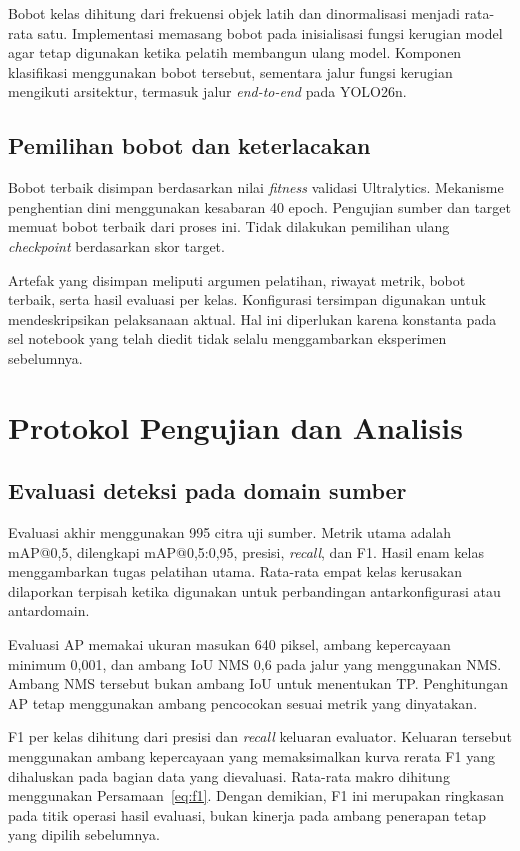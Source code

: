 Bobot kelas dihitung dari frekuensi objek latih dan dinormalisasi menjadi rata-rata satu. Implementasi memasang bobot pada inisialisasi fungsi kerugian model agar tetap digunakan ketika pelatih membangun ulang model. Komponen klasifikasi menggunakan bobot tersebut, sementara jalur fungsi kerugian mengikuti arsitektur, termasuk jalur \textit{end-to-end} pada YOLO26n.

\subsection{Pemilihan bobot dan keterlacakan}
Bobot terbaik disimpan berdasarkan nilai \textit{fitness} validasi Ultralytics. Mekanisme penghentian dini menggunakan kesabaran 40 epoch. Pengujian sumber dan target memuat bobot terbaik dari proses ini. Tidak dilakukan pemilihan ulang \textit{checkpoint} berdasarkan skor target.

Artefak yang disimpan meliputi argumen pelatihan, riwayat metrik, bobot terbaik, serta hasil evaluasi per kelas. Konfigurasi tersimpan digunakan untuk mendeskripsikan pelaksanaan aktual. Hal ini diperlukan karena konstanta pada sel notebook yang telah diedit tidak selalu menggambarkan eksperimen sebelumnya.

\section{Protokol Pengujian dan Analisis}
\subsection{Evaluasi deteksi pada domain sumber}
Evaluasi akhir menggunakan 995 citra uji sumber. Metrik utama adalah mAP@0,5, dilengkapi mAP@0,5:0,95, presisi, \textit{recall}, dan F1. Hasil enam kelas menggambarkan tugas pelatihan utama. Rata-rata empat kelas kerusakan dilaporkan terpisah ketika digunakan untuk perbandingan antarkonfigurasi atau antardomain.

Evaluasi AP memakai ukuran masukan 640 piksel, ambang kepercayaan minimum 0,001, dan ambang IoU NMS 0,6 pada jalur yang menggunakan NMS. Ambang NMS tersebut bukan ambang IoU untuk menentukan TP. Penghitungan AP tetap menggunakan ambang pencocokan sesuai metrik yang dinyatakan.

F1 per kelas dihitung dari presisi dan \textit{recall} keluaran evaluator. Keluaran tersebut menggunakan ambang kepercayaan yang memaksimalkan kurva rerata F1 yang dihaluskan pada bagian data yang dievaluasi. Rata-rata makro dihitung menggunakan Persamaan~\eqref{eq:f1}. Dengan demikian, F1 ini merupakan ringkasan pada titik operasi hasil evaluasi, bukan kinerja pada ambang penerapan tetap yang dipilih sebelumnya.

